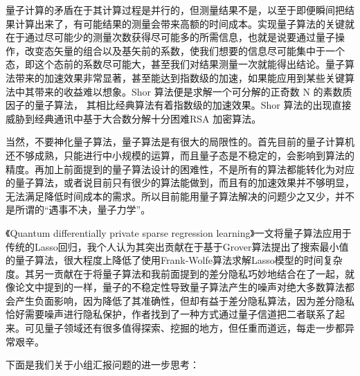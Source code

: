 \documentclass{article}
\begin{document}
\par
量子计算的矛盾在于其计算过程是并行的，但测量结果不是，以至于即便瞬间把结果计算出来了，有可能结果的测量会带来高额的时间成本。实现量子算法的关键就在于通过尽可能少的测量次数获得尽可能多的所需信息，也就是说要通过量子操作，改变态矢量的组合以及基矢前的系数，使我们想要的信息尽可能集中于一个态，即这个态前的系数尽可能大，甚至我们对结果测量一次就能得出结论。量子算法带来的加速效果非常显著，甚至能达到指数级的加速，如果能应用到某些关键算法中其带来的收益难以想象。Shor 算法便是求解一个可分解的正奇数 N 的素数质因子的量子算法， 其相比经典算法有着指数级的加速效果。Shor 算法的出现直接威胁到经典通讯中基于大合数分解十分困难RSA 加密算法。
\par
当然，不要神化量子算法，量子算法是有很大的局限性的。首先目前的量子计算机还不够成熟，只能进行中小规模的运算，而且量子态是不稳定的，会影响到算法的精度。再加上前面提到的量子算法设计的困难性，不是所有的算法都能转化为对应的量子算法，或者说目前只有很少的算法能做到，而且有的加速效果并不够明显，无法满足降低时间成本的需求。所以目前能用量子算法解决的问题少之又少，并不是所谓的“遇事不决，量子力学”。
\par 
《Quantum differentially private sparse regression learning》\citep{2020arXiv200711921D}一文将量子算法应用于传统的Lasso回归，我个人认为其突出贡献在于基于Grover算法提出了搜索最小值的量子算法，很大程度上降低了使用Frank-Wolfe算法求解Lasso模型的时间复杂度。其另一贡献在于将量子算法和我前面提到的差分隐私巧妙地结合在了一起，就像论文中提到的一样，量子的不稳定性导致量子算法产生的噪声对绝大多数算法都会产生负面影响，因为降低了其准确性，但却有益于差分隐私算法，因为差分隐私恰好需要噪声进行隐私保护，作者找到了一种方式通过量子信道把二者联系了起来。可见量子领域还有很多值得探索、挖掘的地方，但任重而道远，每走一步都异常艰辛。
\par
下面是我们关于小组汇报问题的进一步思考：
\end{document}
